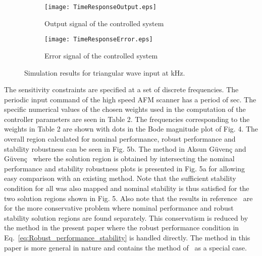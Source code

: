 \documentclass[12pt,draftcls,onecolumn]{IEEEtran}
\begin{document}
\begin{figure}
        \centering
        \begin{subfigure}[b]{0.5\textwidth}
                \texttt{[image: TimeResponseOutput.eps]}
                \caption{Output signal of the controlled system}
                \label{fig:gull}
        \end{subfigure}\begin{subfigure}[b]{0.5\textwidth}
                \texttt{[image: TimeResponseError.eps]}
                \caption{Error signal of the controlled system}
                \label{fig:tiger}
        \end{subfigure}
        \caption{Simulation results for triangular wave input at  kHz.}\label{fig:animals}
\end{figure}

The sensitivity constraints are specified at a set of discrete frequencies. The periodic input command of the high speed AFM
scanner has a period of  sec. The specific numerical values of the chosen weights used in the computation of the
controller parameters are seen in Table 2. The frequencies corresponding to the weights in Table 2 are shown with dots in the
Bode magnitude plot of Fig. 4. The overall region calculated for nominal performance, robust performance and stability robustness
can be seen in Fig. 5b. The method in Aksun G\"uven\c{c} and G\"uven\c{c}~\cite{GuG:06} where the solution region is obtained by
intersecting the nominal performance and stability robustness plots is presented in Fig. 5a for allowing easy comparison with an
existing method. Note that the sufficient stability condition  for all  was also mapped and nominal stability is thus satisfied for the two solution regions shown in Fig. 5. Also note that the results in reference~\cite{GuG:06} are for the more conservative problem where nominal performance and robust stability solution regions are found separately. This conservatism
is reduced by the method in the present paper where the robust performance condition in Eq.~\eqref{eq:Robust_performance_stability} is handled directly. The method in this paper is more general in nature and contains the method of~\cite{GuG:06} as a special case.
\end{document}
